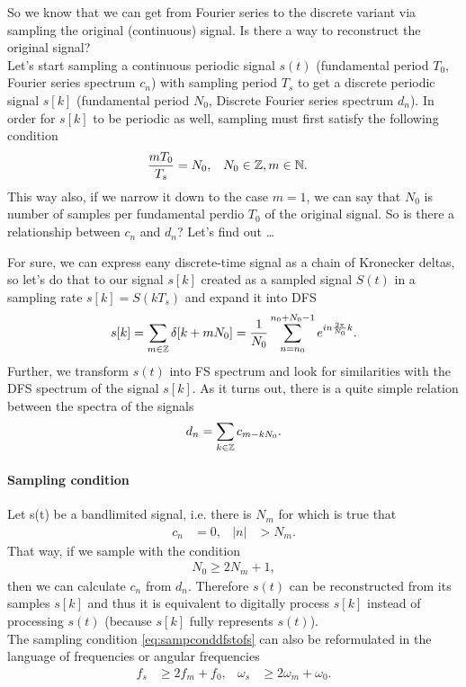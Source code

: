 \documentclass[11pt,a4paper]{report}
\theoremstyle{remark}
\theoremstyle{definition}
\begin{document}
				So we know that we can get from Fourier series to the discrete variant via sampling the original (continuous) signal. Is there a way to reconstruct the original signal? \\
				Let's start sampling a continuous periodic signal $s(t)$ (fundamental period $T_0$, Fourier series spectrum $c_n$) with sampling period $T_s$ to get a discrete periodic signal $s[k]$ (fundamental period $N_0$, Discrete Fourier series spectrum $d_n$). In order for $s[k]$ to be periodic as well, sampling must first satisfy the following condition
				\begin{align}
					\frac{mT_0}{T_s} &= N_0, & &N_0 \in {\mathbb Z}, m \in {\mathbb N}.
				\end{align}
				This way also, if we narrow it down to the case $m=1$, we can say that $N_0$ is number of samples per fundamental perdio $T_0$ of the original signal. So is there a relationship between $c_n$ and $d_n$? Let's find out \dots
				
				For sure, we can express eany discrete-time signal as a chain of Kronecker deltas, so let's do that to our signal $s[k]$ created as a sampled signal $S(t)$ in a sampling rate $s[k] = S(kT_s)$ and expand it into DFS
				\begin{align}
					s[k] = \sum_{m \in {\mathbb Z}} \delta[k+mN_0] = \frac{1}{N_0} \sum_{n=n_0}^{n_0+N_0-1} e^{in \frac{2\pi}{N_0} k}.
				\end{align}
				Further, we transform $s(t)$ into FS spectrum and look for similarities with the DFS spectrum of the signal $s[k]$. As it turns out, there is a quite simple relation between the spectra of the signals
				\begin{align}
					d_n = \sum_{k \in {\mathbb Z}} c_{m-kN_0}.
				\end{align}
				
				\paragraph{Sampling condition} Let s(t) be a bandlimited signal, i.e. there is $N_m$ for which is true that
				\begin{align}
					c_n &= 0, & |n| &> N_m.
				\end{align}
				That way, if we sample with the condition
				\begin{align}
					\label{eq:sampconddfstofs}
					N_0 \geq 2 N_m + 1,
				\end{align}
				then we can calculate $c_n$ from $d_n$. Therefore $s(t)$ can be reconstructed from its samples $s[k]$ and thus it is equivalent to digitally process $s[k]$ instead of processing $s(t)$ (because $s[k]$ fully represents $s(t)$). \\
				The sampling condition \eqref{eq:sampconddfstofs} can also be reformulated in the language of frequencies or angular frequencies
				\begin{align}
					f_s &\geq 2 f_m + f_0, & \omega_s &\geq 2 \omega_m + \omega_0.
				\end{align}
				
\end{document}
